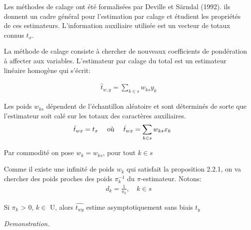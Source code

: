 \documentclass[11pt,fleqn]{book} %
\begin{document}
Les méthodes de calage ont été formalisées par Deville et Särndal (1992). ils donnent un cadre général pour l'estimation par calage et étudient les propriétés de ces estimateurs. L'information auxiliaire utilisée est un vecteur de totaux connus $t_{x}$. 

\begin{definition}
La méthode de calage consiste à chercher de nouveaux coefficients de pondération à affecter aux variables.
L'estimateur par calage du total est un estimateur linéaire homogène qui s'écrit:

\begin{align*}
&  \hat{t}_{w,y}=\sum_{k\in s} w_{ks}y_k
\end{align*}
\end{definition}

\begin{proposition}[]
Les poids $w_{ks}$ dépendent de l'échantillon aléatoire et sont déterminés de sorte que l'estimateur soit calé sur les totaux des caractères auxiliaires.   
\begin{align*}
&  \hat{t}_{wx}=t_x \quad \textnormal{ où } \quad \hat{t}_{wx}=  \sum_{k\in s} w_{ks}x_k
\end{align*}
\end{proposition}

\begin{notation}
Par commodité on pose $w_k=w_{ks}$, pour tout $k\in s$
\end{notation}

\vspace{1em}

\begin{remark}
Comme il existe une infinité de poids $w_k$ qui satisfait la proposition 2.2.1, on va chercher des poids proches des poids $ \pi_k^{-1}$ du $\pi$-estimateur. Notons:
\begin{align*}
&  d_k=\frac{1}{\pi_k} ,\quad k\in s  
\end{align*}
\end{remark}

\vspace{1em}

\begin{theorem}
Si $\pi_k$ > 0, $k\in$ U, alors $\hat{t_{wy}}$ estime asymptotiquement sans biais $t_y$ 
\end{theorem}


\textit{Demonstration.}
\end{document}
